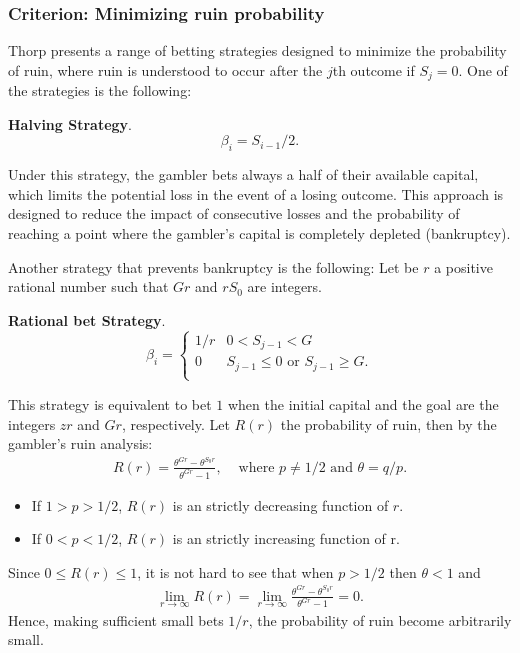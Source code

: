 \documentclass[11pt,twoside]{article}
\numberwithin{Theorem}{section}
\numberwithin{Definition}{section}
\numberwithin{Lemma}{section}
\numberwithin{Algorithm}{section}
\numberwithin{equation}{section}
\begin{document}
\subsubsection{Criterion: Minimizing ruin probability}
Thorp\cite{Thorp} presents a range of betting strategies designed to minimize the probability of ruin, where ruin is understood to occur after the $j$th outcome if $S_{j} = 0$. One of the strategies is the following:
\begin{tcolorbox}[colback=gray!10,boxrule=0.25pt]
\textbf{Halving Strategy}.\\
\begin{equation*}
\beta_{i} = S_{i-1}/2.
\end{equation*}
\end{tcolorbox}

Under this strategy, the gambler bets always a half of their available capital, which limits the potential loss in the event of a losing outcome. This approach is designed to reduce the impact of consecutive losses and the probability of reaching a point where the gambler's capital is completely depleted (bankruptcy).

Another strategy that prevents bankruptcy is the following: 
Let be $r$ a positive rational number such that $Gr$ and $rS_{0}$ are integers. 

\begin{tcolorbox}[colback=gray!10,boxrule=0.25pt]
\textbf{Rational bet Strategy}.\\
\begin{equation*}
\beta_{i} = \left\{
\begin{array}{ll}
1/r&  0 < S_{j-1} < G\\
0 &  S_{j-1} \leq 0 \text{ or }S_{j-1} \geq G.\\
\end{array}
\right.
\end{equation*}
\end{tcolorbox}

This strategy is equivalent to bet $1$ when the initial capital and the goal are the integers $zr$ and $Gr$, respectively. Let  $R(r)$ the probability of ruin, then by the gambler's ruin analysis:
\begin{eqnarray*}
R(r)  = \frac{\theta^{Gr} - \theta^{S_{0}r}}{\theta^{Gr} -1}, & \text{ where } p\neq 1/2 \text{ and } \theta = q/p.
\end{eqnarray*}

\begin{itemize}
    \item If $1> p > 1/2$, $R(r)$ is an strictly decreasing function of $r$. 
    \item If $0< p < 1/2$, $R(r)$ is an strictly increasing function of r. 
\end{itemize}
Since $0\leq R(r) \leq 1$, it is not hard to see that when $p>1/2$ then $\theta < 1$ and
\begin{eqnarray*}
    \lim_{r \to \infty} R(r) =  \lim_{r \to \infty}\frac{\theta^{Gr}- \theta^{S_{0}r}}{\theta^{Gr} -1} = 0.
\end{eqnarray*}
Hence, making sufficient small bets $1/r$, the probability of ruin become arbitrarily small. \\
\end{document}
